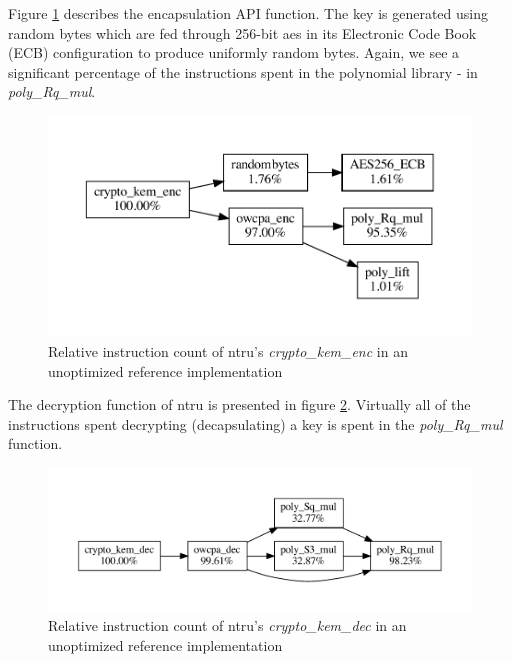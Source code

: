 \noindent Figure \ref{figure:result:hot-paths:ntru:crypto_kem_enc} describes the encapsulation API function. The key is generated using random bytes which are fed through 256-bit \gls{aes} in its Electronic Code Book (ECB) configuration to produce uniformly random bytes. Again, we see a significant percentage of the instructions spent in the polynomial library - in \textit{poly\_Rq\_mul}.

\begin{figure}[H]
    \centering
    \includegraphics[scale=0.5]{chapters/results/hot-paths/ntru/crypto_kem_enc.pdf}
    \caption{Relative instruction count of \gls{ntru}'s \textit{crypto\_kem\_enc} in an unoptimized reference implementation}
    \label{figure:result:hot-paths:ntru:crypto_kem_enc}
\end{figure}

\noindent The decryption function of \gls{ntru} is presented in figure \ref{figure:result:hot-paths:ntru:crypto_kem_dec}. Virtually all of the instructions spent decrypting (decapsulating) a key is spent in the \textit{poly\_Rq\_mul} function.

\begin{figure}[H]
    \centering
    \includegraphics[scale=0.5]{chapters/results/hot-paths/ntru/crypto_kem_dec.pdf}
    \caption{Relative instruction count of \gls{ntru}'s \textit{crypto\_kem\_dec} in an unoptimized reference implementation}
    \label{figure:result:hot-paths:ntru:crypto_kem_dec}
\end{figure}

